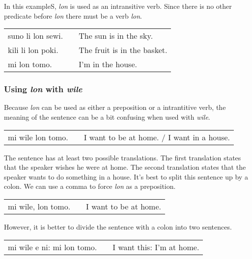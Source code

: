 In this exampleS, \textit{lon} is used as an intransitive verb. 
Since there is no other predicate before \textit{lon} there must be a verb \textit{lon}.

\begin{supertabular}{p{5,5cm}|ll}
suno li lon sewi. && The sun is in the sky. \\
kili li lon poki. && The fruit is in the basket. \\
mi lon tomo. && I'm in the house. \\
\end{supertabular} 
%
\subsubsection*{Using \textit{lon} with \textit{wile}}
%
Because \textit{lon} can be used as either a preposition or a intrantitive verb, the meaning of the sentence can be a bit confusing when used with \textit{wile}. 

\begin{supertabular}{p{5,5cm}|ll}
mi wile lon tomo. && I want to be at home. / I want in a house. \\
\end{supertabular} 

The sentence has at least two possible translations. 
The first translation states that the speaker wishes he were at home. 
The second translation states that the speaker wants to do something in a house. 
It's best to split this sentence up by a colon.
We can use a comma to force \textit{lon} as a preposition.

\begin{supertabular}{p{5,5cm}|ll}
mi wile, lon tomo. && I want to be at home. \\
\end{supertabular}

However, it is better to divide the sentence with a colon into two sentences.

\begin{supertabular}{p{5,5cm}|ll}
mi wile e ni: mi lon tomo. && I want this: I'm at home. \\
\end{supertabular} 


